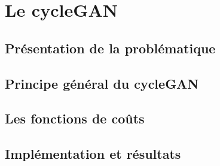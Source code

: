 \chapter{Le cycleGAN}

\section{Présentation de la problématique}


\section{Principe général du cycleGAN}


\section{Les fonctions de coûts}


\section{Implémentation et résultats}